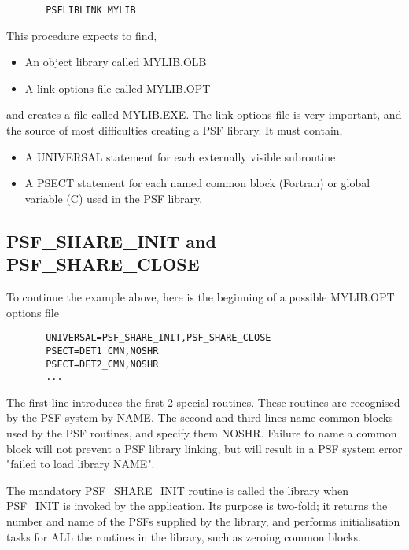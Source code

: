 \begin{verbatim}
       PSFLIBLINK MYLIB
\end{verbatim}

     This procedure expects to find,

\begin{itemize}
\item
       An object library called MYLIB.OLB
\item
       A link options file called MYLIB.OPT
\end{itemize}

     and creates a file called MYLIB.EXE. The link options file is 
     very important, and the source of most difficulties creating a 
     PSF library. It must contain,

\begin{itemize}
\item
       A UNIVERSAL statement for each externally visible
          subroutine
\item
       A PSECT statement for each named common block (Fortran)
          or global variable (C) used in the PSF library.
\end{itemize}

\subsection{PSF\_SHARE\_INIT and PSF\_SHARE\_CLOSE}

     To continue the example above, here is the beginning of a 
     possible MYLIB.OPT options file

\begin{verbatim}
       UNIVERSAL=PSF_SHARE_INIT,PSF_SHARE_CLOSE
       PSECT=DET1_CMN,NOSHR
       PSECT=DET2_CMN,NOSHR
       ...
\end{verbatim}

     The first line introduces the first 2 special routines. These
     routines are recognised by the PSF system by NAME. The second
     and third lines name common blocks used by the PSF routines,
     and specify them NOSHR. Failure to name a common block will
     not prevent a PSF library linking, but will result in a PSF
     system error "failed to load library NAME".

     The mandatory PSF\_SHARE\_INIT routine is called the library 
     when PSF\_INIT is invoked by the application. Its purpose is
     two-fold; it returns the number and name of the PSFs supplied
     by the library, and performs initialisation tasks for ALL the
     routines in the library, such as zeroing common blocks.

